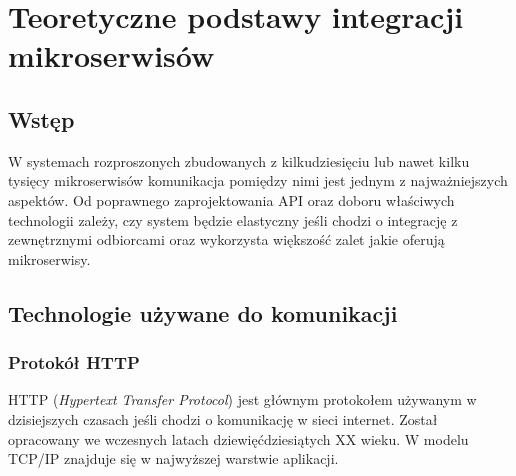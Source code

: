 \chapter{Teoretyczne podstawy integracji mikroserwisów}
\section{Wstęp}
W systemach rozproszonych zbudowanych z kilkudziesięciu lub nawet kilku tysięcy mikroserwisów komunikacja pomiędzy nimi jest jednym z najważniejszych aspektów. Od poprawnego zaprojektowania API oraz doboru właściwych technologii zależy, czy system będzie elastyczny jeśli chodzi o integrację z zewnętrznymi odbiorcami oraz wykorzysta większość zalet jakie oferują mikroserwisy.
\section{Technologie używane do komunikacji}
\subsection{Protokół HTTP}
HTTP (\textit{Hypertext Transfer Protocol}) jest głównym protokołem używanym w dzisiejszych czasach jeśli chodzi o komunikację w sieci internet. Został opracowany we wczesnych latach dziewięćdziesiątych XX wieku. W modelu TCP/IP znajduje się w najwyższej warstwie aplikacji. 
